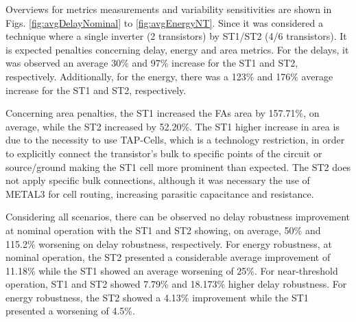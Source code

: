 \documentclass[pgmicro,mestrado,english]{iiufrgs}
\begin{document}
Overviews for metrics measurements and variability sensitivities are shown in Figs. \ref{fig:avgDelayNominal} to \ref{fig:avgEnergyNT}. Since it was considered a technique where a single inverter (2 transistors) by ST1/ST2 (4/6 transistors). It is expected penalties concerning delay, energy and area metrics. For the delays, it was observed an average 30\% and 97\% increase for the ST1 and ST2, respectively. Additionally, for the energy, there was a 123\% and 176\% average increase for the ST1 and ST2, respectively.

Concerning area penalties, the ST1 increased the FAs area by 157.71\%, on average, while the ST2 increased by 52.20\%. The ST1 higher increase in area is due to the necessity to use TAP-Cells, which is a technology restriction, in order to explicitly connect the transistor's bulk to specific points of the circuit or source/ground making the ST1 cell more prominent than expected. The ST2 does not apply specific bulk connections, although it was necessary the use of METAL3 for cell routing, increasing parasitic capacitance and resistance.

Considering all scenarios, there can be observed no delay robustness improvement at nominal operation with the ST1 and ST2 showing, on average, 50\% and 115.2\% worsening on delay robustness, respectively. For energy robustness, at nominal operation, the ST2 presented a considerable average improvement of 11.18\% while the ST1 showed an average worsening of 25\%. For near-threshold operation, ST1 and ST2 showed 7.79\% and 18.173\% higher delay robustness. For energy robustness, the ST2 showed a 4.13\% improvement while the ST1 presented a worsening of 4.5\%.

\end{document}
